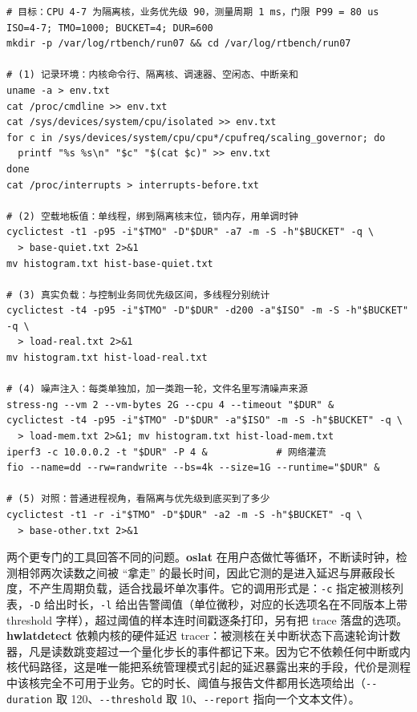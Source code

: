 \documentclass[12pt,a4paper,fontset=fandol]{ctexbook}
\newcommand{\Tp}[1]{\texttt{#1}}
\newcommand{\Opt}[1]{\texttt{-\/-#1}}
\begin{document}
\begin{lstlisting}[style=shellstyle,caption={Shell：cyclictest 空载、加压与噪声注入的采集序列},label={lst:ch11-cyclictest}]
# 目标：CPU 4-7 为隔离核，业务优先级 90，测量周期 1 ms，门限 P99 = 80 us
ISO=4-7; TMO=1000; BUCKET=4; DUR=600
mkdir -p /var/log/rtbench/run07 && cd /var/log/rtbench/run07

# (1) 记录环境：内核命令行、隔离核、调速器、空闲态、中断亲和
uname -a > env.txt
cat /proc/cmdline >> env.txt
cat /sys/devices/system/cpu/isolated >> env.txt
for c in /sys/devices/system/cpu/cpu*/cpufreq/scaling_governor; do
  printf "%s %s\n" "$c" "$(cat $c)" >> env.txt
done
cat /proc/interrupts > interrupts-before.txt

# (2) 空载地板值：单线程，绑到隔离核末位，锁内存，用单调时钟
cyclictest -t1 -p95 -i"$TMO" -D"$DUR" -a7 -m -S -h"$BUCKET" -q \
  > base-quiet.txt 2>&1
mv histogram.txt hist-base-quiet.txt

# (3) 真实负载：与控制业务同优先级区间，多线程分别统计
cyclictest -t4 -p95 -i"$TMO" -D"$DUR" -d200 -a"$ISO" -m -S -h"$BUCKET" -q \
  > load-real.txt 2>&1
mv histogram.txt hist-load-real.txt

# (4) 噪声注入：每类单独加，加一类跑一轮，文件名里写清噪声来源
stress-ng --vm 2 --vm-bytes 2G --cpu 4 --timeout "$DUR" &
cyclictest -t4 -p95 -i"$TMO" -D"$DUR" -a"$ISO" -m -S -h"$BUCKET" -q \
  > load-mem.txt 2>&1; mv histogram.txt hist-load-mem.txt
iperf3 -c 10.0.0.2 -t "$DUR" -P 4 &            # 网络灌流
fio --name=dd --rw=randwrite --bs=4k --size=1G --runtime="$DUR" &

# (5) 对照：普通进程视角，看隔离与优先级到底买到了多少
cyclictest -t1 -r -i"$TMO" -D"$DUR" -a2 -m -S -h"$BUCKET" -q \
  > base-other.txt 2>&1
\end{lstlisting}

两个更专门的工具回答不同的问题。\textbf{oslat} 在用户态做忙等循环，不断读时钟，检测相邻两次读数之间被 ``拿走'' 的最长时间，因此它测的是进入延迟与屏蔽段长度，不产生周期负载，适合找最坏单次事件。它的调用形式是：\Tp{-c} 指定被测核列表，\Tp{-D} 给出时长，\Tp{-l} 给出告警阈值（单位微秒，对应的长选项名在不同版本上带 threshold 字样），超过阈值的样本连时间戳逐条打印，另有把 trace 落盘的选项。\textbf{hwlatdetect} 依赖内核的硬件延迟 tracer：被测核在关中断状态下高速轮询计数器，凡是读数跳变超过一个量化步长的事件都记下来。因为它不依赖任何中断或内核代码路径，这是唯一能把系统管理模式引起的延迟暴露出来的手段，代价是测程中该核完全不可用于业务。它的时长、阈值与报告文件都用长选项给出（\Opt{duration} 取 120、\Opt{threshold} 取 10、\Opt{report} 指向一个文本文件）。
\end{document}
